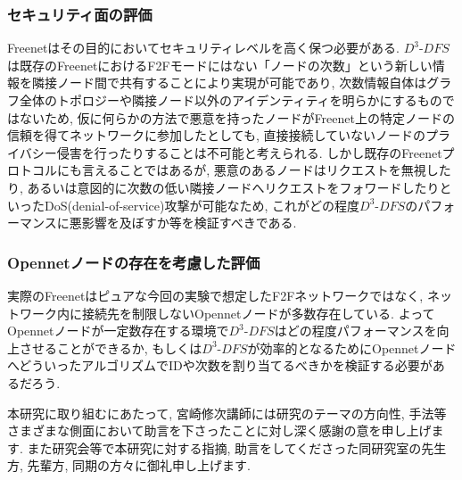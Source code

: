 \documentclass[dvipdfmx]{ampbt}
\begin{document}
\subsubsection*{セキュリティ面の評価}
Freenetはその目的においてセキュリティレベルを高く保つ必要がある. $D^3$-$DFS$は既存のFreenetにおけるF2Fモードにはない「ノードの次数」という新しい情報を隣接ノード間で共有することにより実現が可能であり, 次数情報自体はグラフ全体のトポロジーや隣接ノード以外のアイデンティティを明らかにするものではないため, 仮に何らかの方法で悪意を持ったノードがFreenet上の特定ノードの信頼を得てネットワークに参加したとしても, 直接接続していないノードのプライバシー侵害を行ったりすることは不可能と考えられる. しかし既存のFreenetプロトコルにも言えることではあるが, 悪意のあるノードはリクエストを無視したり, あるいは意図的に次数の低い隣接ノードへリクエストをフォワードしたりといったDoS(denial-of-service)攻撃が可能なため, これがどの程度$D^3$-$DFS$のパフォーマンスに悪影響を及ぼすか等を検証すべきである.

\subsubsection*{Opennetノードの存在を考慮した評価}
実際のFreenetはピュアな今回の実験で想定したF2Fネットワークではなく, ネットワーク内に接続先を制限しないOpennetノードが多数存在している. よってOpennetノードが一定数存在する環境で$D^3$-$DFS$はどの程度パフォーマンスを向上させることができるか, もしくは$D^3$-$DFS$が効率的となるためにOpennetノードへどういったアルゴリズムでIDや次数を割り当てるべきかを検証する必要があるだろう. 

\acknowledgment
本研究に取り組むにあたって, 宮崎修次講師には研究のテーマの方向性, 手法等さまざまな側面において助言を下さったことに対し深く感謝の意を申し上げます. また研究会等で本研究に対する指摘, 助言をしてくださった同研究室の先生方, 先輩方, 同期の方々に御礼申し上げます.





\clearpage
\appendix
\end{document}
